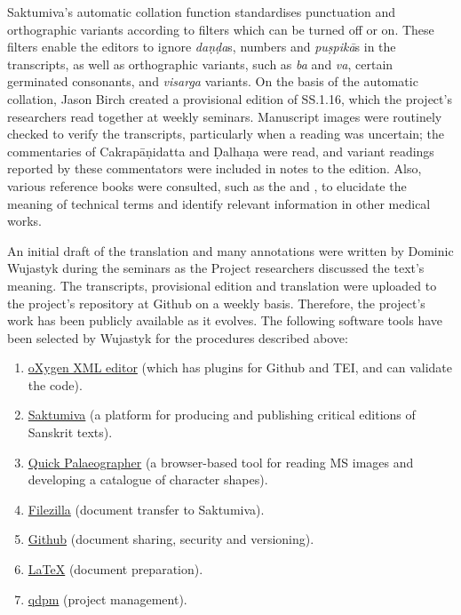 Saktumiva's automatic collation function standardises punctuation and 
orthographic variants according to filters which can be turned off or on. These 
filters enable the editors to ignore \emph{daṇḍa}s, numbers and 
\emph{puṣpikā}s in the transcripts, as well as orthographic variants, such as 
\emph{ba} and \emph{va}, certain germinated consonants, and \emph{visarga} 
variants. On the basis of the automatic collation, Jason Birch created a provisional 
edition of SS.1.16, which the project's researchers read together at weekly 
seminars. Manuscript images were routinely checked to verify the transcripts, 
particularly when a reading was uncertain; the commentaries of Cakrapāṇidatta 
and Ḍalhaṇa were read, and variant readings reported by these commentators 
were included in notes to the edition. Also, various reference books were 
consulted, such as the  \citet{josi-maha,nadk-1954} and \citet{meul-hist}, to 
elucidate the meaning of technical terms and identify relevant information in 
other medical works. 

An initial draft of the translation and many annotations were written by Dominic 
Wujastyk during the seminars as the Project researchers discussed the text's 
meaning. The transcripts, provisional edition and translation were uploaded to the 
project's repository at Github on a weekly basis. Therefore, the project's work has 
been publicly available as it evolves. The following software tools have been 
selected by Wujastyk for the procedures described above: 

\begin{enumerate}
    \item
    \href{https://www.oxygenxml.com.}{oXygen XML editor} (which has plugins for 
    Github and TEI, and can validate the 
    code).%
    
    \item
    \href{http://saktumiva.org.}{Saktumiva} (a platform for producing and 
    publishing critical editions of Sanskrit texts).%
    \item
    \href{https://tst.hypotheses.org/1738.}{Quick Palaeographer} (a 
    browser-based tool for reading MS images and developing a catalogue of 
    character shapes).%
    
    \item
    \href{https://filezilla-project.org.}{Filezilla} (document transfer to 
    Saktumiva).%
    \item
    \href{https://github.com.}{Github} (document sharing, security and 
    versioning).%
    \item
    \href{https://www.latex-project.org.}{LaTeX} (document 
    preparation).%
    \item
    \href{https://qdpm.net.}{qdpm} (project 
    management).%
    
\end{enumerate}

